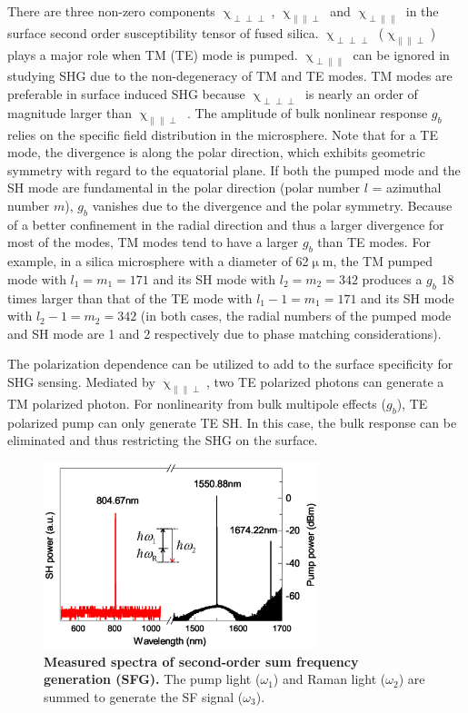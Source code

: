 \documentclass[a4paper,8pt,hyperref, twocolumn]{article}
\begin{document}
There are three non-zero components $\upchi_{\perp \perp \perp}$, $\upchi_{\parallel \parallel \perp}$ and $\upchi_{\perp \parallel \parallel}$ in the surface second order susceptibility tensor of fused silica.  $\upchi_{\perp \perp \perp}$ ($\upchi_{\parallel \parallel \perp}$) plays a major role when TM (TE) mode is pumped. $\upchi_{\perp \parallel \parallel}$ can be ignored in studying SHG due to the non-degeneracy of TM and TE modes. TM modes are preferable in surface induced SHG because $\upchi_{\perp \perp \perp}$ is nearly an order of magnitude larger than $\upchi_{\parallel \parallel \perp}$ \cite{rodriguez2008calibration}. The amplitude of bulk nonlinear response $g_b$ relies on the specific field distribution in the microsphere.  Note that for a TE mode, the divergence is along the polar direction, which exhibits geometric symmetry with regard to the equatorial plane. If both the pumped mode and the SH mode are fundamental in the polar direction (polar number $l$ = azimuthal number $m$), $g_b$ vanishes due to the divergence and the polar symmetry. Because of a better confinement in the radial direction and thus a larger divergence for most of the modes, TM modes tend to have a larger $g_b$ than TE modes. For example, in a silica microsphere with a diameter of 62$\upmu$m, the TM pumped mode with $l_1=m_1=171$ and its SH mode with $l_2=m_2=342$ produces a $g_b$ 18 times larger than that of the TE mode with $l_1-1=m_1=171$ and its SH mode with $l_2-1=m_2=342$ (in both cases, the radial numbers of the pumped mode and SH mode are 1 and 2 respectively due to phase matching considerations). 

The polarization dependence can be utilized to add to the surface specificity for SHG sensing. Mediated by $\upchi_{\parallel \parallel \perp}$, two TE polarized photons can generate a TM polarized photon. For nonlinearity from bulk multipole effects ($g_b$), TE polarized pump can only generate TE SH. In this case, the bulk response can be eliminated and thus restricting the SHG on the surface.



\begin{figure}[!ht]
\centering
\includegraphics[width=8cm]{Fig4.eps}
\caption{\textbf{Measured spectra of second-order sum frequency generation (SFG). }The pump light ($\omega_1$) and Raman light ($\omega_2$) are summed to generate the SF signal ($\omega_3$).}
\label{pic:Fig4}
\end{figure}
\end{document}
